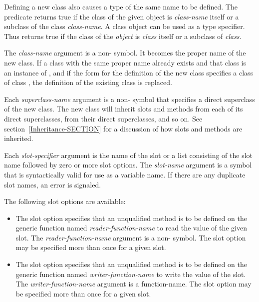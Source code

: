 \begin{defmac}
Defining a new class also causes a type of the same name to be
defined.  The predicate  returns
true if the class of the given object is \emph{class-name} itself or
a subclass of the class \emph{class-name}.  A class object can be used
as a type specifier.  Thus  returns true
if the class of the \emph{object} is \emph{class} itself or a
subclass of \emph{class}.

The \emph{class-name} argument is a non- symbol.  It becomes
the proper name of the new class.  If a class with the same proper
name already exists and that class is an instance of 
, and if the  form for the definition of the
new class specifies a class of class , the definition
of the existing class is replaced.

Each \emph{superclass-name} argument is a non- symbol that
specifies a direct superclass of the new class.  The new class will
inherit slots and methods from each of its direct superclasses, from
their direct superclasses, and so on.  See
section~\ref{Inheritance-SECTION}
for a discussion of how slots and methods are inherited.

Each \emph{slot-specifier} argument is the name of the slot or a list
consisting of the slot name followed by zero or more slot options.
The \emph{slot-name} argument is a symbol that is syntactically valid
for use as a variable name.  If there are any duplicate
slot names, an error is signaled.

The following slot options are available:

\begin{itemize}

\item 
The  slot option specifies that an unqualified method is
to be defined on the generic function named \emph{reader-function-name} to read
the value of the given slot. 
The \emph{reader-function-name} argument is a non-
symbol.  The  slot option may be specified more than once
for a given slot.

\item  
The  slot option specifies that an unqualified method is
to be defined on the generic function named \emph{writer-function-name} to write
the value of the slot.  The 
\emph{writer-function-name} argument is a function-name.
The  slot option may be specified more than once for a
given slot.


\end{itemize}
\end{defmac}
